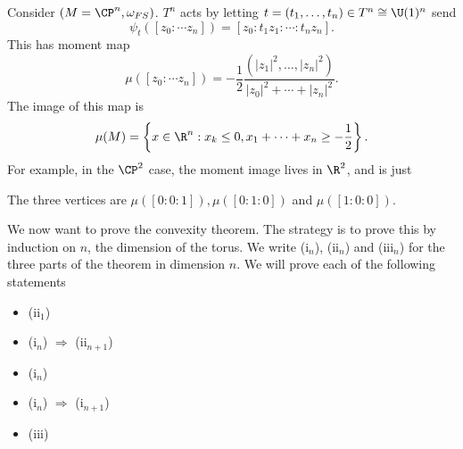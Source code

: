 \documentclass[a4paper]{article}
\begin{document}
\begin{eg}
  Consider $(M = \CP^n, \omega_{FS})$. $T^n$ acts by letting $t = (t_1, \ldots, t_n) \in T^n \cong \U(1)^n$ send
  \[
    \psi_t([z_0: \cdots z_n]) = [z_0: t_1 z_1: \cdots :t_n z_n].
  \]
  This has moment map
  \[
    \mu([z_0: \cdots z_n]) = -\frac{1}{2} \frac{(|z_1|^2, \ldots, |z_n|^2)}{|z_0|^2 + \cdots + |z_n|^2}.
  \]
  The image of this map is
  \[
    \mu(M) = \left\{x \in \R^n: x_k \leq 0, x_1 + \cdots + x_n \geq -\frac{1}{2}\right\}.
  \]
  For example, in the $\CP^2$ case, the moment image lives in $\R^2$, and is just
  \begin{center}
  \end{center}
  The three vertices are $\mu([0:0:1]), \mu([0:1:0])$ and $\mu([1:0:0])$.
\end{eg}

We now want to prove the convexity theorem. The strategy is to prove this by induction on $n$, the dimension of the torus. We write (i$_n$), (ii$_n$) and (iii$_n$) for the three parts of the theorem in dimension $n$. We will prove each of the following statements
\begin{itemize}
  \item (ii$_1$)
  \item (i$_n$) $\Rightarrow$ (ii$_{n + 1}$)
  \item (i$_n$)
  \item (i$_n$) $\Rightarrow$ (i$_{n + 1}$)
  \item (iii)
\end{itemize}
\end{document}
